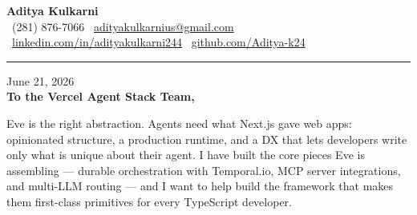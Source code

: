 \documentclass[11pt,letterpaper]{article}
\begin{document}
\begin{center}
    {\Huge \textbf{\color{VercelBlack} Aditya Kulkarni}}\\[8pt]
    {\color{DarkGrey} \small
    \faPhone \ (281) 876-7066 \quad \textbar \quad
    \faEnvelope \ \href{mailto:adityakulkarnius@gmail.com}{adityakulkarnius@gmail.com} \\[4pt]
    \faLinkedin \ \href{https://linkedin.com/in/adityakulkarni244}{linkedin.com/in/adityakulkarni244} \quad \textbar \quad
    \faGithub \ \href{https://github.com/Aditya-k24}{github.com/Aditya-k24}
    }
\end{center}

\vspace{-4pt}
{\color{VercelBlack}\rule{\linewidth}{1.5pt}}
\vspace{10pt}

June 21, 2026\\[10pt]
\textbf{To the Vercel Agent Stack Team,}

\vspace{6pt}

Eve is the right abstraction. Agents need what Next.js gave web apps: opinionated structure, a production runtime, and a DX that lets developers write only what is unique about their agent. I have built the core pieces Eve is assembling --- durable orchestration with Temporal.io, MCP server integrations, and multi-LLM routing --- and I want to help build the framework that makes them first-class primitives for every TypeScript developer.

\vspace{4pt}
\end{document}
